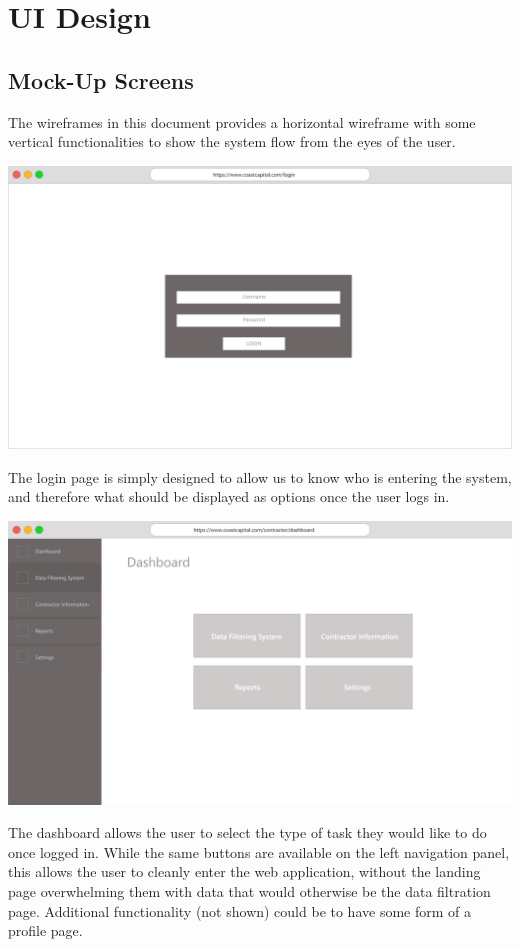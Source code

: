 \documentclass[11pt, titlepage]{article}
\begin{document}
\section{UI Design}

\subsection{Mock-Up Screens}

The wireframes in this document provides a horizontal wireframe with some vertical functionalities to show the system flow from the eyes of the user. 

\includegraphics[width=1.0\textwidth]{../design/Login}

The login page is simply designed to allow us to know who is entering the system, and therefore what should be displayed as options once the user logs in.

\includegraphics[width=1.0\textwidth]{../design/Dashboard}

The dashboard allows the user to select the type of task they would like to do once logged in. While the same buttons are available on the left navigation panel, this allows the user to cleanly enter the web application, without the landing page overwhelming them with data that would otherwise be the data filtration page. Additional functionality (not shown) could be to have some form of a profile page. 
\end{document}
